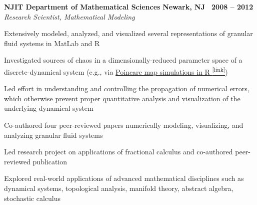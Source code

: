 \documentclass[10pt]{article}
\newcommand{\leftandright}[2]{\noindent\textbf{#1}\hfill
\textbf{#2}}
\begin{document}
\leftandright{NJIT Department of Mathematical Sciences}{Newark, NJ \textbullet\, 2008 -- 2012}\\  
\vspace{-0.8em}
\textit{Research Scientist, Mathematical Modeling} 
\begin{itemize*}
  \item Extensively modeled, analyzed, and visualized several
    representations of granular fluid systems in MatLab and R
  \item Investigated sources of chaos in a 
    dimensionally-reduced parameter space of a discrete-dynamical system
    (e.g., via \href{http://kevin-urban.com/video/R__gamma-var_restitution-0.8.gif}{Poincare
    map simulations in R \textsuperscript{\tiny{[link]}}})
  \item Led effort in understanding and controlling the propagation of numerical errors, 
    which otherwise prevent proper quantitative analysis and
    visualization of the underlying dynamical system
  \item Co-authored four peer-reviewed papers numerically modeling,
    visualizing, and analyzing granular fluid systems
  \item Led research project on applications of fractional calculus and
    co-authored peer-reviewed publication 
  \item Explored real-world applications of advanced mathematical disciplines such as
    dynamical systems, topological analysis, manifold theory, abstract
    algebra, stochastic calculus
\end{itemize*}
\end{document}
